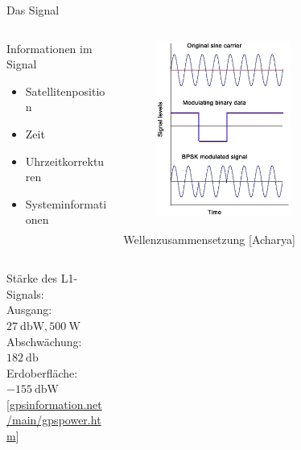 \begin{frame}{Das Signal}
    \begin{columns}
        \begin{column}{0.5\textwidth}
            Informationen im Signal
            \begin{itemize}
                \item Satellitenposition
                \item Zeit
                \item Uhrzeitkorrekturen
                \item Systeminformationen
                \end{itemize}
                ~\\~\\
                Stärke des L1-Signals: \\
                Ausgang: $\SI{27}{\decibel\watt}, \SI{500}{\watt}$ \\
                Abschwächung: $\SI{182}{\decibel}$ \\
                Erdoberfläche: $\SI{-155}{\decibel\watt}$ \\
                {\small [\url{gpsinformation.net/main/gpspower.htm}]}
        \end{column}
        \begin{column}{0.5\textwidth}
            \begin{figure}
                \centering
                \includegraphics[width=0.6\textwidth]{images/signalzusammensetzung.png}
            \end{figure}
            Wellenzusammensetzung {\small[Acharya]}
        \end{column}
    \end{columns}
\end{frame}
